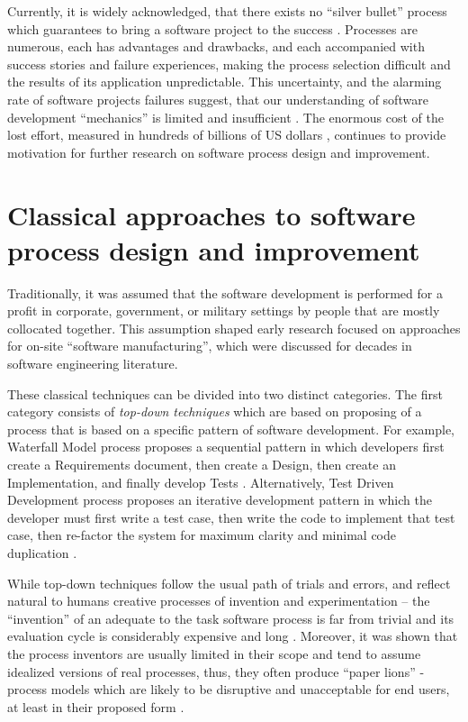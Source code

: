 Currently, it is widely acknowledged, that there exists no ``silver bullet'' process which 
guarantees to bring a software project to the success \cite{citeulike:1986013}. 
Processes are numerous, each has advantages and drawbacks, and each accompanied with 
success stories and failure experiences, making the process selection difficult 
and the results of its application unpredictable.
This uncertainty, and the alarming rate of software projects failures suggest, that our understanding 
of software development ``mechanics'' is limited and insufficient \cite{citeulike:12550665}. 
The enormous cost of the lost effort, measured in hundreds of billions of US dollars 
\cite{citeulike:2207657} \cite{citeulike:2207653} \cite{citeulike:2207655}, 
continues to provide motivation for further research on software process design and improvement. 

%
%
\section{Classical approaches to software process design and improvement}\label{section_software_process_design}
Traditionally, it was assumed that the software development is performed for a profit in 
corporate, government, or military settings by people that are mostly collocated together. 
This assumption shaped early research focused on approaches for on-site ``software manufacturing'',
which were discussed for decades in software engineering literature. 

These classical techniques can be divided into two distinct categories. 
The first category consists of \textit{top-down techniques} which are based on proposing of a process 
that is based on a specific pattern of software development. 
For example, Waterfall Model process proposes a sequential pattern in which developers first create a 
Requirements document, then create a Design, then create an Implementation, and finally develop Tests 
\cite{citeulike:9982731}. 
Alternatively,  Test Driven Development process proposes an iterative development pattern in which
the developer must first write a test case, then write the code to implement that test case, then re-factor 
the system for maximum clarity and minimal code duplication \cite{citeulike:6086365}. 

While top-down techniques follow the usual path of trials and errors, and reflect natural to 
humans creative processes of invention and experimentation -- the ``invention'' of an adequate to 
the task software process is far from trivial and its evaluation cycle is considerably expensive 
and long \cite{citeulike:5043104} \cite{citeulike:1986013}.
Moreover, it was shown that the process inventors are usually limited in their scope and tend to 
assume idealized versions of real processes, thus, they often produce ``paper lions'' - process 
models which are likely to be disruptive and unacceptable for end users, 
at least in their proposed form \cite{citeulike:9758924}.

